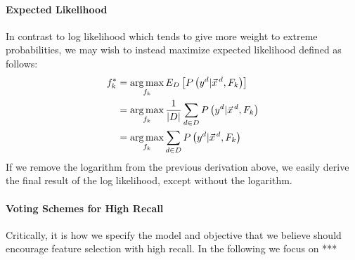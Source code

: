 \paragraph{Expected Likelihood}

In contrast to log likelihood which tends to give more weight to extreme
probabilities, we may wish to instead maximize expected likelihood
defined as follows:
\begin{align*}
f_k^*&=\argmax_{f_k}E_D\left[P\left(y^d|\vec{x}^{\,d},F_k\right)\right]\nonumber\\
&=\argmax_{f_k}\frac{1}{|D|}\sum_{d\in D} P\left(y^d | \vec{x}^{\,d},F_k\right)\nonumber\\
&=\argmax_{f_k} \sum_{d\in D} P\left(y^d | \vec{x}^{\,d},F_k\right)\nonumber\\
\end{align*}
If we remove the logarithm from the previous derivation above, we easily
derive the final result of the log likelihood, except without the logarithm.


\paragraph{Voting Schemes for High Recall}

Critically, it is how we specify the model and objective that we
believe should encourage feature selection with high recall.  
In the following we focus on ***

